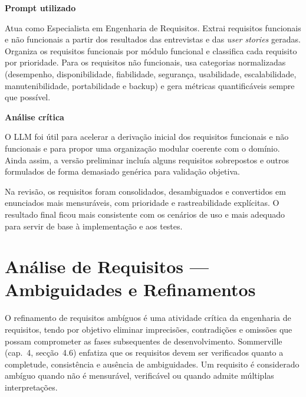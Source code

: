     \begin{tcolorbox}[title=Interação com o LLM]
    \textbf{Prompt utilizado}

    Atua como Especialista em Engenharia de Requisitos. Extrai requisitos funcionais e não funcionais a partir dos resultados das entrevistas e das \textit{user stories} geradas. Organiza os requisitos funcionais por módulo funcional e classifica cada requisito por prioridade. Para os requisitos não funcionais, usa categorias normalizadas (desempenho, disponibilidade, fiabilidade, segurança, usabilidade, escalabilidade, manutenibilidade, portabilidade e backup) e gera métricas quantificáveis sempre que possível.

    \tcblower

    \textbf{Análise crítica}

    O LLM foi útil para acelerar a derivação inicial dos requisitos funcionais e não funcionais e para propor uma organização modular coerente com o domínio. Ainda assim, a versão preliminar incluía alguns requisitos sobrepostos e outros formulados de forma demasiado genérica para validação objetiva.

    Na revisão, os requisitos foram consolidados, desambiguados e convertidos em enunciados mais mensuráveis, com prioridade e rastreabilidade explícitas. O resultado final ficou mais consistente com os cenários de uso e mais adequado para servir de base à implementação e aos testes.
    \end{tcolorbox}



\section{Análise de Requisitos --- Ambiguidades e Refinamentos}
\label{sec:ambiguidades}

    O refinamento de requisitos ambíguos é uma atividade crítica da engenharia de requisitos, tendo por objetivo eliminar imprecisões, contradições e omissões que possam comprometer as fases subsequentes de desenvolvimento. Sommerville~\cite{sommerville2016} (cap.~4, secção~4.6) enfatiza que os requisitos devem ser verificados quanto a completude, consistência e ausência de ambiguidades. Um requisito é considerado ambíguo quando não é mensurável, verificável ou quando admite múltiplas interpretações.


